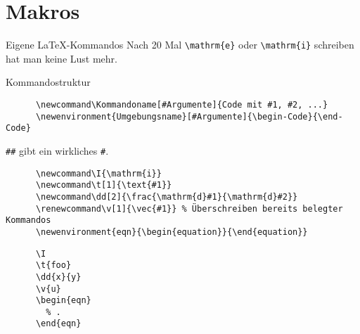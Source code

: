 \section{Makros}

\begin{frame}[fragile]{Eigene \LaTeX-Kommandos}
  Nach 20 Mal \lstinline+\mathrm{e}+ oder \lstinline+\mathrm{i}+ schreiben hat man keine Lust mehr.
  \begin{block}{Kommandostruktur}
    \begin{lstlisting}
      \newcommand\Kommandoname[#Argumente]{Code mit #1, #2, ...}
      \newenvironment{Umgebungsname}[#Argumente]{\begin-Code}{\end-Code}
    \end{lstlisting}
  \end{block}
  \verb+##+ gibt ein wirkliches \verb+#+.
  \begin{CodeExample}{0.75}
    \begin{lstlisting}
      \newcommand\I{\mathrm{i}}
      \newcommand\t[1]{\text{#1}}
      \newcommand\dd[2]{\frac{\mathrm{d}#1}{\mathrm{d}#2}}
      \renewcommand\v[1]{\vec{#1}} % Überschreiben bereits belegter Kommandos
      \newenvironment{eqn}{\begin{equation}}{\end{equation}}
    \end{lstlisting}
  \CodeResult
    \begin{lstlisting}
      \I
      \t{foo}
      \dd{x}{y}
      \v{u}
      \begin{eqn}
        % .
      \end{eqn}
    \end{lstlisting}
  \end{CodeExample}
\end{frame}


